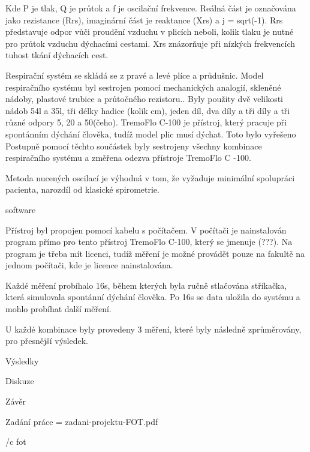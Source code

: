 Kde P je tlak, Q je průtok a f je oscilační frekvence. Reálná část je označována jako rezistance (Rrs), imaginární část je reaktance (Xrs) a j = sqrt(-1). 
Rrs představuje odpor vůči proudění vzduchu v plicích neboli, kolik tlaku je nutné pro průtok vzduchu dýchacími cestami. Xrs znázorňuje při nízkých frekvencích tuhost tkání dýchacích cest. 

 
Respirační systém se skládá se z pravé a levé plíce a průdušnic. Model respiračního systému  byl sestrojen pomocí mechanických analogií, skleněné nádoby, plastové trubice a průtočného rezistoru..  Byly použity dvě velikosti nádob 54l a 35l, tři délky hadice (kolik cm), jeden díl, dva díly a tři díly a tři různé odpory 5, 20 a 50(čeho). 
TremoFlo C-100 je přístroj, který pracuje při spontánním dýchání člověka, tudíž model plic musí dýchat. Toto bylo vyřešeno  
Postupně pomocí těchto součástek byly sestrojeny všechny kombinace respiračního systému a změřena odezva přístroje TremoFlo C -100. 

Metoda nucených oscilací je výhodná v tom, že vyžaduje minimální spolupráci pacienta, narozdíl od klasické spirometrie. 

software 

Přístroj byl propojen pomocí kabelu s počítačem. V počítači je nainstalován program přímo pro tento přístroj TremoFlo C-100, který se jmenuje (???). Na program je třeba mít licenci, tudíž měření je možné provádět pouze na fakultě na jednom počítači, kde je licence nainstalována. 


Každé měření probíhalo 16s, během kterých byla ručně stlačována stříkačka, která simulovala spontánní dýchání člověka. Po 16s se data uložila do systému a mohlo probíhat další měření. 

U každé kombinace byly provedeny 3 měření, které byly následně zprůměrovány, pro přesnější výsledek. 


\chap Výsledky

\chap Diskuze

\chap Závěr



\app Zadání práce
\picw=\hsize %
\cinspic zadani-projektu-FOT.pdf


\bibchap
\usebbl/c fot


\bye
